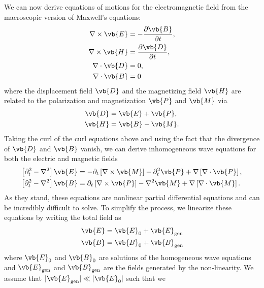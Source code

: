 \documentclass[11pt,SymmetricalJury]{inrsthesis/inrsthesis}
\begin{document}
We can now derive equations of motions for the electromagnetic field from the
macroscopic version of Maxwell's equations:
  \begin{subequations}
  \begin{align}
    \nabla\times\vb{E} &= -\frac{\partial\vb{B}}{\partial t}, \\
    \nabla\times\vb{H} &=  \frac{\partial\vb{D}}{\partial t}, \\
    \nabla\cdot\vb{D}  &= 0, \\
    \nabla\cdot\vb{B}  &= 0
  \end{align}
  \end{subequations}
where the displacement field $\vb{D}$ and the magnetizing field $\vb{H}$ are
related to the polarization and magnetization $\vb{P}$ and $\vb{M}$ via
  \begin{subequations}
  \begin{align}
    \vb{D}  &=\vb{E}+\vb{P}, \\
    \vb{H}  &=\vb{B}-\vb{M}.
  \end{align}
  \end{subequations}
Taking the curl of the curl equations above and using the fact that the
divergence of $\vb{D}$ and $\vb{B}$ vanish, we can derive inhomogeneous
wave equations for both the electric and magnetic fields
  \begin{subequations}
  \begin{align}
    \left[\partial_t^2-\nabla^2\right]\vb{E}
                  &= -\partial_t\left[\nabla\times\vb{M}\right]-\partial_t^2\vb{P}+\nabla\left[\nabla\cdot\vb{P}\right], \\
    \left[\partial_t^2-\nabla^2\right]\vb{B}
                  &= \partial_t\left[\nabla\times\vb{P}\right]-\nabla^2\vb{M}+\nabla\left[\nabla\cdot\vb{M}\right].
  \end{align}
  \end{subequations}
As they stand, these equations are nonlinear partial differential equations and
can be incredibly difficult to solve.  To simplify the process, we linearize these
equations by writing the total field as
  \begin{align}
    \vb{E}  &= \vb{E}_0 + \vb{E}_\text{gen} \\
    \vb{B}  &= \vb{B}_0 + \vb{B}_\text{gen}
  \end{align}
where $\vb{E}_0$ and $\vb{B}_0$ are solutions of the homogeneous wave equations
and $\vb{E}_\text{gen}$ and $\vb{B}_\text{gen}$ are the fields generated by the
non-linearity. We assume that $|\vb{E}_\text{gen}|\ll|\vb{E}_0|$ such that we
\end{document}

